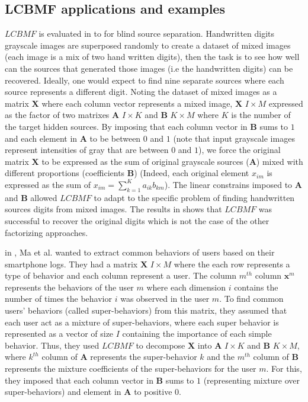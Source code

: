 \subsection{LCBMF applications and examples}

$LCBMF$ is evaluated in \cite{bnmf} to for blind source separation. Handwritten digits grayscale images are superposed randomly to create a dataset of mixed images (each image is a mix of two hand written digits), then the task is to see how well can the sources that generated those images (i.e the handwritten digits) can be recovered. Ideally, one would expect to find nine separate sources where each source represents a different digit. Noting the dataset of mixed images as a matrix $\boldsymbol{X}$ where each column vector represents a mixed image, $\boldsymbol{X}$ $I \times M$ expressed as the factor of two matrixes $\boldsymbol{A}$ $I \times K$ and $\boldsymbol{B}$ $K \times M$ where $K$ is the number of the target hidden sources. By imposing that each column vector in $\boldsymbol{B}$ sums to $1$ and each element in $\boldsymbol{A}$ to be between $0$ and $1$ (note that input grayscale images represent intensities of gray that are between $0$ and $1$), we force the original matrix $\boldsymbol{X}$ to be expressed as the sum of original grayscale sources ($\boldsymbol{A}$) mixed with different proportions (coefficients $\boldsymbol{B}$) (Indeed, each original element $x_{im}$ is expressed as the sum of $x_{im}=\sum_{k=1}^{K}a_{ik}b_{km}$). The linear constrains imposed to $\boldsymbol{A}$ and $\boldsymbol{B}$ allowed $LCBMF$ to adapt to the specific problem of finding handwritten sources digits from mixed images. The results in \cite{bnmf} shows that $LCBMF$ was successful to recover the original digits which is not the case of the other factorizing approaches. \par

in \cite{superbehaviors}, Ma et al. wanted to extract common behaviors of users based on their smartphone logs. They had a matrix $\boldsymbol{X}$ $I \times M$ where the each row represents a type of behavior and each column represent a user.  The column $m^{th}$ column $\boldsymbol{x}^{m}$ represents the behaviors of the user $m$ where each dimension $i$ contains the number of times the behavior $i$ was observed in the user $m$. To find common users' behaviors (called super-behaviors) from this matrix, they assumed that each user act as a mixture of super-behaviors, where each super behavior is represented as a vector of size $I$ containing the importance of each simple behavior. Thus, they used $LCBMF$ to decompose $\boldsymbol{X}$ into $\boldsymbol{A}$ $I \times K$ and $\boldsymbol{B}$ $K \times M$, where  $k^{th}$ column of $\boldsymbol{A}$ represents the super-behavior $k$ and the $m^{th}$ column of $\boldsymbol{B}$ represents the mixture coefficients of the super-behaviors for the user $m$. For this, they imposed that each column vector in $\boldsymbol{B}$ sums to $1$ (representing mixture over super-behaviors) and element in $\boldsymbol{A}$ to positive $0$. \par

